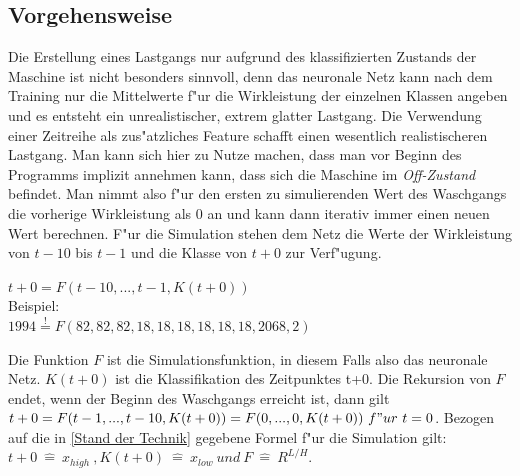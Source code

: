 \subsection{Vorgehensweise}
\label{Vorgehensweise}
Die Erstellung eines Lastgangs nur aufgrund des klassifizierten Zustands der Maschine ist nicht besonders sinnvoll, denn das neuronale Netz kann nach dem Training nur die Mittelwerte f"ur die Wirkleistung der einzelnen Klassen angeben und es entsteht ein unrealistischer, extrem glatter Lastgang. Die Verwendung einer Zeitreihe als zus"atzliches Feature schafft einen wesentlich realistischeren Lastgang. Man kann sich hier zu Nutze machen, dass man vor Beginn des Programms implizit annehmen kann, dass sich die Maschine im \textit{Off-Zustand} befindet. Man nimmt also f"ur den ersten zu simulierenden Wert des Waschgangs die vorherige Wirkleistung als 0 an und kann dann iterativ immer einen neuen Wert berechnen. F"ur die Simulation stehen dem Netz die Werte der Wirkleistung von $t-10$ bis $t-1$ und die Klasse von $t+0$ zur Verf"ugung.\\
\begin{center}
$t+0 = F(t-10,...,t-1,K(t+0))$ \\
Beispiel: \\
$1994 \stackrel{!}{=} F(82,82,82,18,18,18,18,18,18,2068, 2)$
\end{center}
Die Funktion $F$ ist die Simulationsfunktion, in diesem Falls also das neuronale Netz. $K(t+0)$ ist die Klassifikation des Zeitpunktes t+0. Die Rekursion von $F$ endet, wenn der Beginn des Waschgangs erreicht ist, dann gilt \\
$t+0 = F(t-1,...,t-10,K(t+0)) = F(0,...,0,K(t+0))\ f"ur\ t = 0$.
Bezogen auf die in \ref{Stand der Technik} gegebene Formel f"ur die Simulation gilt: $t+0\ \widehat{=}\ x_{high}\ , K(t+0)\ \widehat{=}\ x_{low}\ und\ F\ \widehat{=}\ R^{L/H}$.